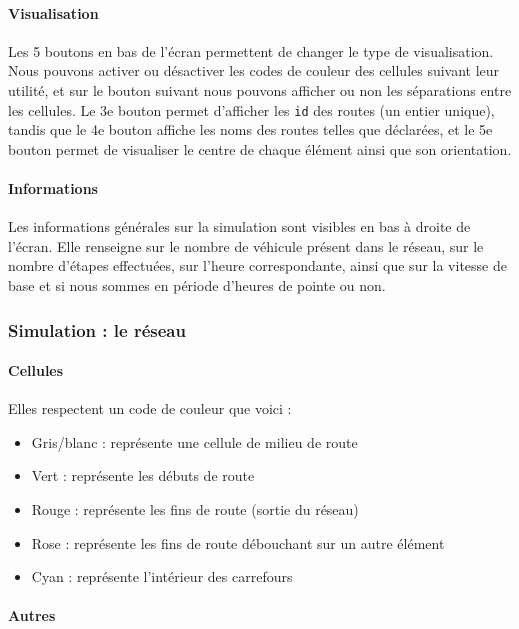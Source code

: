 \documentclass[a4paper,11pt, titlepage]{extarticle}
\begin{document}
\paragraph{Visualisation}

Les 5 boutons en bas de l'écran permettent de changer le type de visualisation. Nous pouvons activer ou désactiver les codes de couleur des cellules suivant leur utilité, et sur le bouton suivant nous pouvons afficher ou non les séparations entre les cellules. Le 3e bouton permet d'afficher les \texttt{id} des routes (un entier unique), tandis que le 4e bouton affiche les noms des routes telles que déclarées, et le 5e bouton permet de visualiser le centre de chaque élément ainsi que son orientation.

\paragraph{Informations}

Les informations générales sur la simulation sont visibles en bas à droite de l'écran. Elle renseigne sur le nombre de véhicule présent dans le réseau, sur le nombre d'étapes effectuées, sur l'heure correspondante, ainsi que sur la vitesse de base et si nous sommes en période d'heures de pointe ou non.

\subsubsection{Simulation : le réseau}

\paragraph{Cellules}

Elles respectent un code de couleur que voici :

\begin{itemize}
\item Gris/blanc : représente une cellule de milieu de route
\item Vert : représente les débuts de route
\item Rouge : représente les fins de route (sortie du réseau)
\item Rose : représente les fins de route débouchant sur un autre élément
\item Cyan : représente l'intérieur des carrefours
\end{itemize}

\paragraph{Autres}
\end{document}
